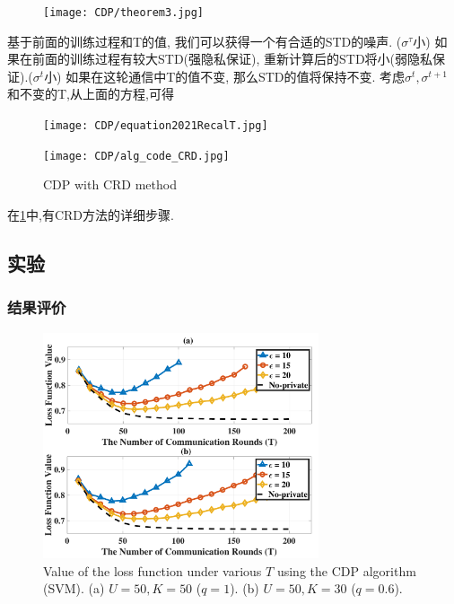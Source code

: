 \begin{theorem}
    \label{theorem3}
    \begin{figure}[ht]
        \centering
        \texttt{[image: CDP/theorem3.jpg]}
    \end{figure}
\end{theorem}

基于前面的训练过程和T的值, 我们可以获得一个有合适的STD的噪声. ($\sigma^\tau$小)
如果在前面的训练过程有较大STD(强隐私保证), 重新计算后的STD将小(弱隐私保证).($\sigma^t$小)
如果在这轮通信中T的值不变, 那么STD的值将保持不变. 
考虑$\sigma^t, \sigma^{t+1}$和不变的T,从上面的方程,可得
\begin{figure}[!ht]
    \centering
    \texttt{[image: CDP/equation2021RecalT.jpg]}
\end{figure} 

\begin{figure}[ht]
    \texttt{[image: CDP/alg\_code\_CRD.jpg]}
    \label{alg_code_CRD}
    \caption{CDP with CRD method}
\end{figure}
    在\ref{alg_code_CRD}中,有CRD方法的详细步骤.

\subsection{实验}
\subsubsection{结果评价}

\begin{figure}[ht]
    \centering
    \includegraphics[width=3.2in,angle=0]{figures/CDP/Svm_ConvforNandK_T.pdf}
    \caption{Value of the loss function under various $T$ using the CDP algorithm (SVM). (a) $U=50, K=50$ ($q=1$). (b) $U=50, K=30$ ($q=0.6$).}
    \label{fig:SVM_ConvforNandK_T}
    \end{figure}

